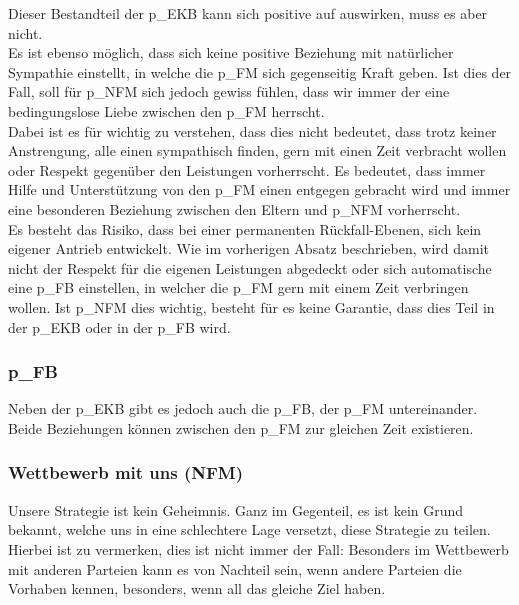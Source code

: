 Dieser Bestandteil der \gls{p_EKB} kann sich positive auf  auswirken, muss es aber nicht.\\
Es ist ebenso möglich, dass sich keine positive Beziehung mit natürlicher Sympathie einstellt, in welche die \gls{p_FM} sich gegenseitig Kraft geben. Ist dies der Fall, soll für \gls{p_NFM} sich jedoch gewiss fühlen, dass wir immer der eine bedingungslose Liebe zwischen den \gls{p_FM} herrscht.\\

Dabei ist es für  wichtig zu verstehen, dass dies nicht bedeutet, dass trotz keiner Anstrengung, alle einen sympathisch finden, gern mit einen Zeit verbracht wollen oder Respekt gegenüber den Leistungen vorherrscht. Es bedeutet, dass immer Hilfe und Unterstützung von den \gls{p_FM} einen entgegen gebracht wird und immer eine besonderen Beziehung zwischen den Eltern und \gls{p_NFM} vorherrscht.\\

Es besteht das Risiko, dass bei einer permanenten Rückfall-Ebenen, sich kein eigener Antrieb entwickelt. Wie im vorherigen Absatz beschrieben, wird damit nicht der Respekt für die eigenen Leistungen abgedeckt oder sich automatische eine \gls{p_FB} einstellen, in welcher die \gls{p_FM} gern mit einem Zeit verbringen wollen. Ist \gls{p_NFM} dies wichtig, besteht für es keine Garantie, dass dies Teil in der \gls{p_EKB} oder in der \gls{p_FB} wird.

\subsubsection{\gls{p_FB}} Neben der \gls{p_EKB} gibt es jedoch auch die \gls{p_FB}, der \gls{p_FM} untereinander. Beide Beziehungen können zwischen den \gls{p_FM} zur gleichen Zeit existieren.

\subsubsection{Wettbewerb mit uns (NFM)}
Unsere Strategie ist kein Geheimnis. Ganz im Gegenteil, es ist kein Grund bekannt, welche uns in eine schlechtere Lage versetzt, diese Strategie zu teilen. Hierbei ist zu vermerken, dies ist nicht immer der Fall: Besonders im Wettbewerb mit anderen Parteien kann es von Nachteil sein, wenn andere Parteien die Vorhaben kennen, besonders, wenn all das gleiche Ziel haben.\\


